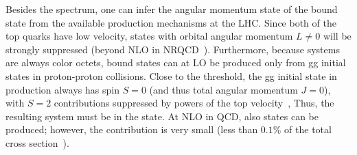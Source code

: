 Besides the \mtt spectrum, one can infer the angular momentum state of the \ttbar bound state from the available production mechanisms at the LHC. 
Since both of the top quarks have low velocity, states with orbital angular momentum $L \neq 0$ will be strongly suppressed (beyond NLO in NRQCD~\cite{Kiyo:2008bv}). 
Furthermore, because \qqbar systems are always color octets, \ttbar bound states can at LO be produced only from gg initial states in proton-proton collisions. 
Close to the \ttbar threshold, the gg initial state in \ttbar production always has spin $S = 0$ (and thus total angular momentum $J = 0$), with $S = 2$ contributions suppressed by powers of the top velocity~\cite{Cheng:2024btk},
Thus, the resulting \ttbar system must be in the  state. At NLO in QCD, also  states can be produced; however, the contribution is very small (less than $0.1\%$ of the total cross section~\cite{Kiyo:2008bv}).



